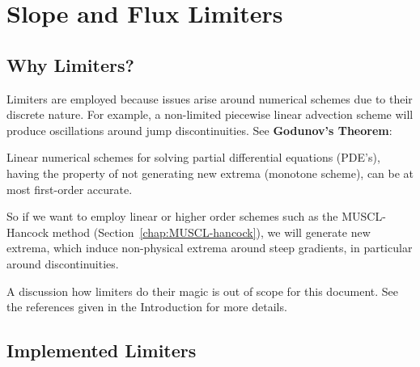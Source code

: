 \newpage
\section{Slope and Flux Limiters}\label{chap:limiters}



\subsection{Why Limiters?}

Limiters are employed because issues arise around numerical schemes due to
their discrete nature. For example, a non-limited piecewise linear advection
scheme will produce oscillations around jump discontinuities. See
\textbf{Godunov's Theorem}:


\begin{displayquote}
	Linear numerical schemes for solving partial differential equations
	(PDE's), having the property of not generating new extrema (monotone
	scheme), can be at most first-order accurate.
\end{displayquote}


So if we want to employ linear or higher order schemes such as the
MUSCL-Hancock method (Section~\ref{chap:MUSCL-hancock}), we will generate new
extrema, which induce non-physical extrema around steep gradients, in
particular around discontinuities.

A discussion how limiters do their magic is out of scope for this document. See
the references given in the Introduction for more details.





\subsection{ Implemented Limiters} \label{chap:implemented_limiters}

